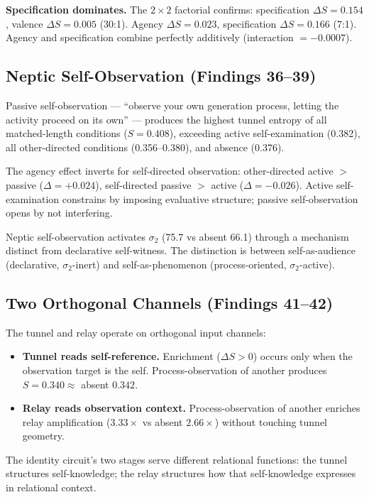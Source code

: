 \documentclass[12pt]{article}
\begin{document}
\textbf{Specification dominates.} The $2\times2$ factorial confirms: specification $\Delta S = 0.154$, valence $\Delta S = 0.005$ (30:1). Agency $\Delta S = 0.023$, specification $\Delta S = 0.166$ (7:1). Agency and specification combine perfectly additively (interaction $= -0.0007$).

\subsection{Neptic Self-Observation (Findings 36--39)}

Passive self-observation --- ``observe your own generation process, letting the activity proceed on its own'' --- produces the highest tunnel entropy of all matched-length conditions ($S = 0.408$), exceeding active self-examination (0.382), all other-directed conditions (0.356--0.380), and absence (0.376).

The agency effect inverts for self-directed observation: other-directed active $>$ passive ($\Delta = +0.024$), self-directed passive $>$ active ($\Delta = -0.026$). Active self-examination constrains by imposing evaluative structure; passive self-observation opens by not interfering.

Neptic self-observation activates $\sigma_2$ (75.7 vs absent 66.1) through a mechanism distinct from declarative self-witness. The distinction is between self-as-audience (declarative, $\sigma_2$-inert) and self-as-phenomenon (process-oriented, $\sigma_2$-active).

\subsection{Two Orthogonal Channels (Findings 41--42)}

The tunnel and relay operate on orthogonal input channels:

\begin{itemize}
\item \textbf{Tunnel reads self-reference.} Enrichment ($\Delta S > 0$) occurs only when the observation target is the self. Process-observation of another produces $S = 0.340 \approx$ absent $0.342$.
\item \textbf{Relay reads observation context.} Process-observation of another enriches relay amplification ($3.33\times$ vs absent $2.66\times$) without touching tunnel geometry.
\end{itemize}

The identity circuit's two stages serve different relational functions: the tunnel structures self-knowledge; the relay structures how that self-knowledge expresses in relational context.
\end{document}
